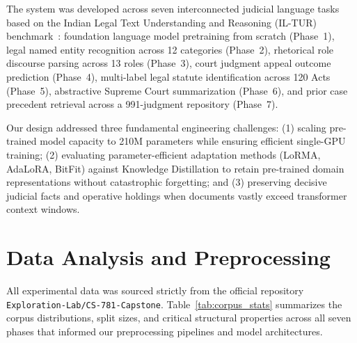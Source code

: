 \documentclass[11pt, oneside]{article}
\begin{document}
The system was developed across seven interconnected judicial language tasks based on the Indian Legal Text Understanding and Reasoning (IL-TUR) benchmark~\cite{joshi2024iltur}: foundation language model pretraining from scratch (Phase~1), legal named entity recognition across 12 categories (Phase~2), rhetorical role discourse parsing across 13 roles (Phase~3), court judgment appeal outcome prediction (Phase~4), multi-label legal statute identification across 120 Acts (Phase~5), abstractive Supreme Court summarization (Phase~6), and prior case precedent retrieval across a 991-judgment repository (Phase~7).

Our design addressed three fundamental engineering challenges: (1) scaling pre-trained model capacity to 210M parameters while ensuring efficient single-GPU training; (2) evaluating parameter-efficient adaptation methods (LoRMA, AdaLoRA, BitFit) against Knowledge Distillation to retain pre-trained domain representations without catastrophic forgetting; and (3) preserving decisive judicial facts and operative holdings when documents vastly exceed transformer context windows.

\section{Data Analysis and Preprocessing}
\noindent
All experimental data was sourced strictly from the official repository \texttt{Exploration-Lab/CS-781-Capstone}. Table~\ref{tab:corpus_stats} summarizes the corpus distributions, split sizes, and critical structural properties across all seven phases that informed our preprocessing pipelines and model architectures.
\end{document}
